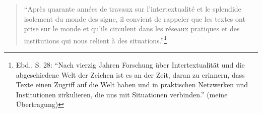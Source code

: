 \begin{flushleft}
\begin{quote}
\enquote{Après quarante années de travaux sur l'intertextualité et le
splendide isolement du monde des signe, il convient de rappeler que les
textes ont prise sur le monde et qu'ils circulent dans les réseaux
pratiques et des institutions qui nous relient à des
situations.}\footnote{Ebd., S. 28: \enquote{Nach vierzig Jahren
  Forschung über Intertextualität und die abgeschiedene Welt der Zeichen
  ist es an der Zeit, daran zu erinnern, dass Texte einen Zugriff auf
  die Welt haben und in praktischen Netzwerken und Institutionen
  zirkulieren, die uns mit Situationen verbinden.} (meine Übertragung)}
\end{quote}
\end{flushleft}

